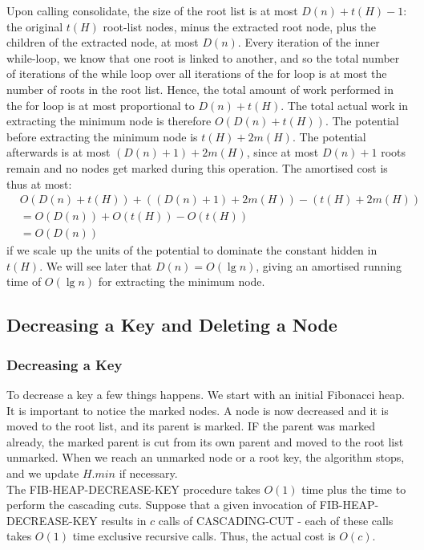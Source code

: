 \documentclass[12pt]{article}
\begin{document}
Upon calling consolidate, the size of the root list is at most $D(n) + t(H) - 1$: the original $t(H)$ root-list nodes, minus the extracted root node, plus the children of the extracted node, at most $D(n)$. Every iteration of the inner while-loop, we know that one root is linked to another, and so the total number of iterations of the while loop over all iterations of the for loop is at most the number of roots in the root list. Hence, the total amount of work performed in the for loop is at most proportional to $D(n)+ t(H)$. The total actual work in extracting the minimum node is therefore $O(D(n) + t(H))$. The potential before extracting the minimum node is $t(H) + 2m(H)$. The potential afterwards is at most $(D(n) + 1) + 2m(H)$, since at most $D(n) + 1$ roots remain and no nodes get marked during this operation. The amortised cost is thus at most:
\begin{align*}
	&O(D(n) + t(H)) + ((D(n) + 1) + 2m(H)) - (t(H) + 2m(H))\\
	&= O(D(n)) + O(t(H)) - O(t(H))\\
	&= O(D(n))
\end{align*}
if we scale up the units of the potential to dominate the constant hidden in $t(H)$. We will see later that $D(n) = O(\lg n)$, giving an amortised running time of $O(\lg n)$ for extracting the minimum node.
%
\subsection{Decreasing a Key and Deleting a Node}
\subsubsection{Decreasing a Key}
To decrease a key a few things happens. We start with an initial Fibonacci heap. It is important to notice the marked nodes. A node is now decreased and it is moved to the root list, and its parent is marked. IF the parent was marked already, the marked parent is cut from its own parent and moved to the root list unmarked. When we reach an unmarked node or a root key, the algorithm stops, and we update $H.min$ if necessary. \\

The FIB-HEAP-DECREASE-KEY procedure takes $O(1)$ time plus the time to perform the cascading cuts. Suppose that a given invocation of FIB-HEAP-DECREASE-KEY results in $c$ calls of CASCADING-CUT - each of these calls takes $O(1)$ time exclusive recursive calls. Thus, the actual cost is $O(c)$. \\
\end{document}
